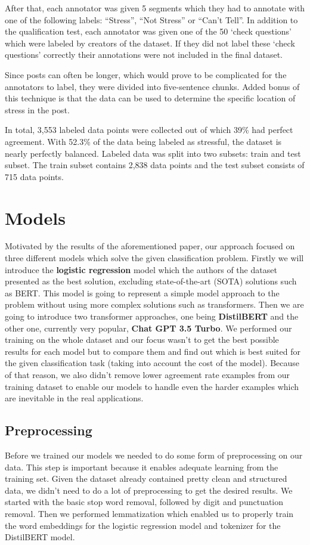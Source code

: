 \documentclass[10pt, a4paper]{article}
\begin{document}
After that, each annotator was given 5 segments which they had to annotate with one of the following labels: ``Stress'', ``Not Stress'' or ``Can't Tell''.
In addition to the qualification test, each annotator was given one of the 50 `check questions' which were labeled by creators of the dataset.
If they did not label these `check questions' correctly their annotations were not included in the final dataset.

Since posts can often be longer, which would prove to be complicated for the annotators to label, they were divided into five-sentence chunks.
Added bonus of this technique is that the data can be used to determine the specific location of stress in the post.

In total, 3,553 labeled data points were collected out of which 39\% had perfect agreement.
With 52.3\% of the data being labeled as stressful, the dataset is nearly perfectly balanced.
Labeled data was split into two subsets: train and test subset.
The train subset contains 2,838 data points and the test subset consists of 715 data points.

\section{Models}
Motivated by the results of the aforementioned paper, our approach focused on three different models which solve the given classification problem.
\hfill \break
\hfill \break
Firstly we will introduce the \textbf{logistic regression} model which the authors of the dataset presented as the best solution, excluding state-of-the-art (SOTA) solutions such as BERT.
This model is going to represent a simple model approach to the problem without using more complex solutions such as transformers.
Then we are going to introduce two transformer approaches, one being \textbf{DistilBERT} and the other one, currently very popular, \textbf{Chat GPT 3.5 Turbo}.
\hfill \break
\hfill \break
We performed our training on the whole dataset and our focus wasn't to get the best possible results for each model but to compare them and find out which is best suited for the given classification task (taking into account the cost of the model).
Because of that reason, we also didn't remove lower agreement rate examples from our training dataset to enable our models to handle even the harder examples which are inevitable in the real applications.

\subsection{Preprocessing}
Before we trained our models we needed to do some form of preprocessing on our data.
This step is important because it enables adequate learning from the training set.
Given the dataset already contained pretty clean and structured data, we didn't need to do a lot of preprocessing to get the desired results.
We started with the basic stop word removal, followed by digit and punctuation removal.
Then we performed lemmatization which enabled us to properly train the word embeddings for the logistic regression model and tokenizer for the DistilBERT model.
\end{document}

